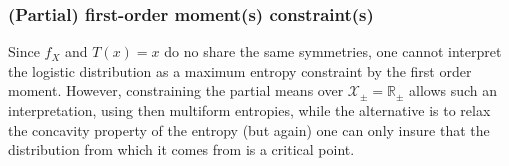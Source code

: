 \documentclass[entropy,article,submit,moreauthors,pdftex]{Definitions/mdpi}
\newcommand{\SZ}[1]{{\color{blue} #1}}                                       %
\newcommand{\Avoir}[1]{{\color{red}\bf #1}}                                  %
\def\Rset{\mathbb{R}}%
\def\X{\mathcal{X}}%
\begin{document}




\subsubsection{(Partial) first-order moment(s) constraint(s)}
\label{subsubsecapp:LogisticFirstPartial}

Since $f_X$ and $T(x) = x$ do no share the same symmetries, one cannot interpret
the logistic  distribution as a  maximum entropy  constraint by the  first order
moment. However, constraining the partial means over $\X_\pm = \Rset_\pm$ allows
such an interpretation, using then multiform entropies, while the alternative is
to relax  the concavity  property of  the entropy \SZ{(but  again) one  can only
  insure that the  distribution from which it comes from  is a critical point}.
\end{document}
